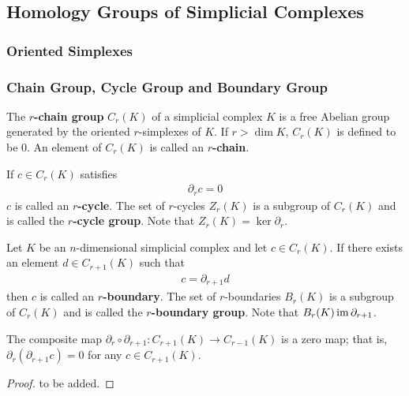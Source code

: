 \documentclass[10pt]{article}
\begin{document}
\subsection{Homology Groups of Simplicial Complexes}
\subsubsection{Oriented Simplexes\label{OrientedSimplexes}}
\subsubsection{Chain Group, Cycle Group and Boundary Group\label{ChainGroupCycleGroupandBoundaryGroup}}
\begin{definition}
    The \textbf{$r$-chain group} $C_r(K)$ of a simplicial complex $K$ is a free Abelian group generated by the oriented $r$-simplexes of $K$.
    If $r>\dim K$, $C_r(K)$ is defined to be 0.
    An element of $C_r(K)$ is called an \textbf{$r$-chain}.
\end{definition}

\begin{definition}
    If $c\in C_r(K)$ satisfies
    \begin{align}
        \partial_r c=0
    \end{align}
    $c$ is called an \textbf{$r$-cycle}.
    The set of $r$-cycles $Z_r(K)$ is a subgroup of $C_r(K)$ and is called the \textbf{$r$-cycle group}.
    Note that $Z_r(K)=\ker\partial_r$.
\end{definition}

\begin{definition}
    Let $K$ be an $n$-dimensional simplicial complex and let $c\in C_r(K)$.
    If there exists an element $d\in C_{r+1}(K)$ such that
    \begin{align}
        c=\partial_{r+1}d
    \end{align}
    then $c$ is called an \textbf{$r$-boundary}.
    The set of $r$-boundaries $B_r(K)$ is a subgroup of $C_r(K)$ and is called the \textbf{$r$-boundary group}.
    Note that $B_r(K)\operatorname{im} \partial_{r+1}$.
\end{definition}

\begin{lemma}
    The composite map $\partial_r\circ \partial_{r+1}:C_{r+1}(K)\to C_{r-1}(K)$ is a zero map;
    that is, $\partial_r(\partial_{r+1}c)=0$ for any $c\in C_{r+1}(K)$.
\end{lemma}
\begin{proof}
    to be added.
\end{proof}
\end{document}
